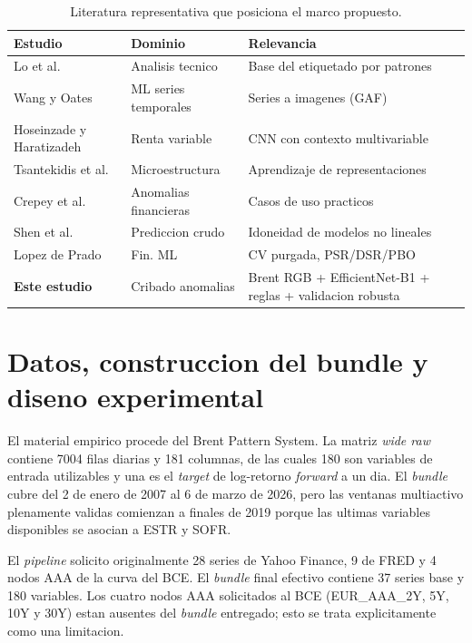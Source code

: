 \documentclass[preprint,12pt,3p]{elsarticle}
\begin{document}
\begin{table}[!ht]
\centering
\caption{Literatura representativa que posiciona el marco propuesto.}
\label{tab:lit}
\small
\begin{tabular}{p{2.6cm}p{2.4cm}p{3.1cm}}
\toprule
\textbf{Estudio} & \textbf{Dominio} & \textbf{Relevancia} \\
\midrule
Lo et al. \cite{lo2000foundations} & Analisis tecnico & Base del etiquetado por patrones \\
Wang y Oates \cite{wang2015imaging} & ML series temporales & Series a imagenes (GAF) \\
Hoseinzade y Haratizadeh \cite{hoseinzade2019cnnpred} & Renta variable & CNN con contexto multivariable \\
Tsantekidis et al. \cite{tsantekidis2020using} & Microestructura & Aprendizaje de representaciones \\
Crepey et al. \cite{crepey2022anomaly} & Anomalias financieras & Casos de uso practicos \\
Shen et al. \cite{shen2024intelligent} & Prediccion crudo & Idoneidad de modelos no lineales \\
Lopez de Prado \cite{lopezdeprado2018advances} & Fin. ML & CV purgada, PSR/DSR/PBO \\
\textbf{Este estudio} & Cribado anomalias & Brent RGB + EfficientNet-B1 + reglas + validacion robusta \\
\bottomrule
\end{tabular}
\end{table}

\section{Datos, construccion del bundle y diseno experimental}
El material empirico procede del Brent Pattern System. La matriz \emph{wide raw}
contiene 7004 filas diarias y 181 columnas, de las cuales 180 son variables de
entrada utilizables y una es el \emph{target} de log-retorno \emph{forward} a un
dia. El \emph{bundle} cubre del 2 de enero de 2007 al 6 de marzo de 2026, pero las
ventanas multiactivo plenamente validas comienzan a finales de 2019 porque las
ultimas variables disponibles se asocian a ESTR y SOFR.

El \emph{pipeline} solicito originalmente 28 series de Yahoo Finance, 9 de FRED y
4 nodos AAA de la curva del BCE. El \emph{bundle} final efectivo contiene 37
series base y 180 variables. Los cuatro nodos AAA solicitados al BCE (EUR\_AAA\_2Y,
5Y, 10Y y 30Y) estan ausentes del \emph{bundle} entregado; esto se trata
explicitamente como una limitacion.
\end{document}
